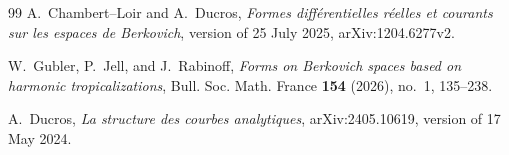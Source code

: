 \documentclass[11pt]{article}
\theoremstyle{remark}
\begin{document}



\begin{thebibliography}{99}
A.~Chambert--Loir and A.~Ducros,
\emph{Formes diff\'erentielles r\'eelles et courants sur les espaces de
Berkovich}, version of 25 July 2025, arXiv:1204.6277v2.

W.~Gubler, P.~Jell, and J.~Rabinoff,
\emph{Forms on Berkovich spaces based on harmonic tropicalizations},
Bull. Soc. Math. France \textbf{154} (2026), no.~1, 135--238.

A.~Ducros,
\emph{La structure des courbes analytiques},
arXiv:2405.10619, version of 17 May 2024.
\end{thebibliography}
\end{document}
